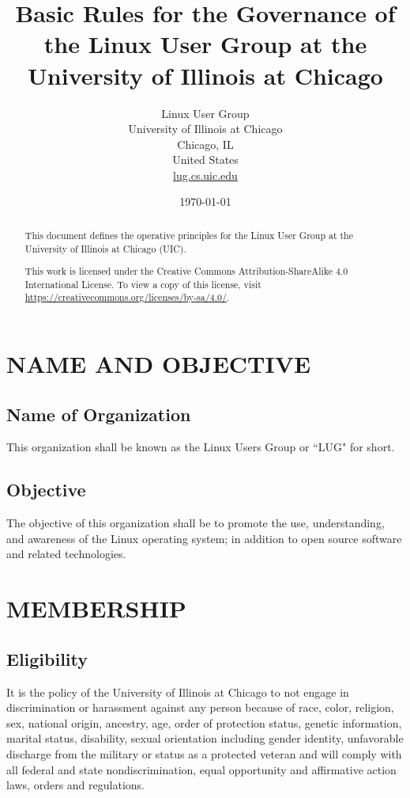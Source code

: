 \documentclass[letter]{report}
\begin{document}
\title{Basic Rules for the Governance of the Linux User Group at the University
of Illinois at Chicago}
\author{Linux User Group\\
	University of Illinois at Chicago\\
	Chicago, IL\\
	United States\\
	\url{lug.cs.uic.edu}}
\date{\today}
\maketitle


\begin{abstract}
	This document defines the operative principles for the Linux
	User Group at the University of Illinois at Chicago (UIC).

	\vfill
	This work is licensed under the Creative Commons Attribution-ShareAlike
	4.0 International License. To view a copy of this license, visit
	\url{https://creativecommons.org/licenses/by-sa/4.0/}.
\end{abstract}


\tableofcontents


\chapter{NAME AND OBJECTIVE}
\section{Name of Organization}
This organization shall be known as the Linux Users Group or ``LUG" for short.

\section{Objective}
The objective of this organization shall be to promote the use, understanding,
and awareness of the Linux operating system; in addition to open source software
and related technologies.


\chapter{MEMBERSHIP}
\section{Eligibility}
It is the policy of the University of Illinois at Chicago to not engage in
discrimination or harassment against any person because of race, color,
religion, sex, national origin, ancestry, age, order of protection status,
genetic information, marital status, disability, sexual orientation including
gender identity, unfavorable discharge from the military or status as a
protected veteran and will comply with all federal and state nondiscrimination,
equal opportunity and affirmative action laws, orders and regulations.
\end{document}
